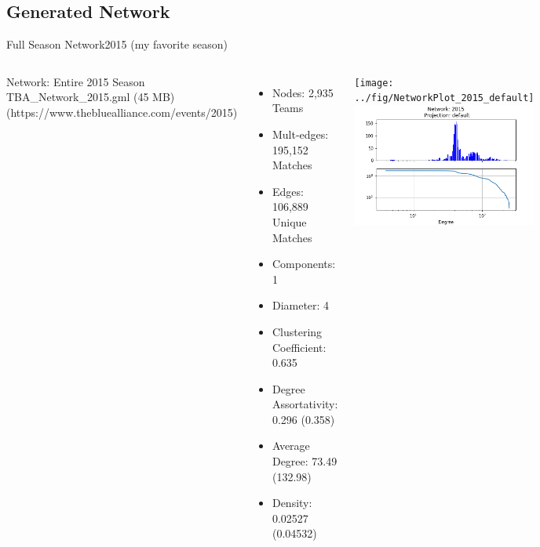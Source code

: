 \documentclass[10pt]{beamer}
\begin{document}
\subsection{Generated Network}
\begin{frame}{Full Season Network}{2015 (my favorite season)}
	\begin{columns}
			Network: Entire 2015 Season\\
			{\scriptsize TBA\_Network\_2015.gml (45 MB)}\\
			{\scriptsize(https://www.thebluealliance.com/events/2015)}
			\begin{itemize}
				\item Nodes: 2,935 Teams
				\item Mult-edges: 195,152 Matches
				\item Edges: 106,889 Unique Matches
				\item Components: 1
				\item Diameter: 4
				\item Clustering Coefficient: 0.635
				\item Degree Assortativity: 0.296 (0.358)
				\item Average Degree: 73.49 (132.98)
				\item Density: 0.02527 (0.04532)
			\end{itemize}
			\centering
			\texttt{[image: ../fig/NetworkPlot\_2015\_default]}\\
			\includegraphics[width=\columnwidth]{../fig/DegreeDist_2015_default}
	\end{columns}
\end{frame}
\end{document}
